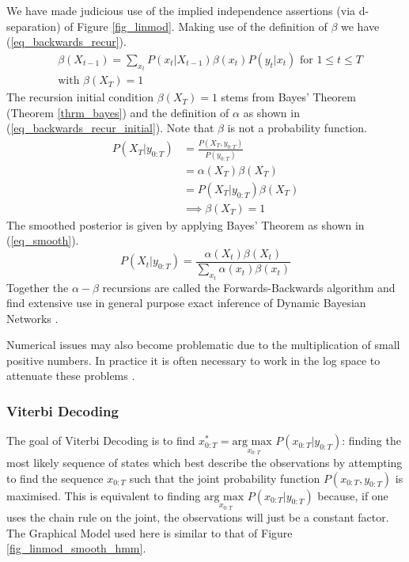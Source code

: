 We have made judicious use of the implied independence assertions (via d-separation) of Figure \ref{fig_linmod}. Making use of the definition of $\beta$ we have (\ref{eq_backwards_recur}).
\begin{equation}
\begin{aligned}
&\beta(X_{t-1}) = \sum_{x_t} P(x_t | X_{t-1})\beta(x_t)P(y_t| x_t) \text{ for } 1 \leq t \leq T \\
&\text{with } \beta(X_T) = 1
\end{aligned}
\label{eq_backwards_recur}
\end{equation}
The recursion initial condition $\beta(X_T) = 1$ stems from Bayes' Theorem (Theorem \ref{thrm_bayes}) and the definition of $\alpha$ as shown in (\ref{eq_backwards_recur_initial}). Note that $\beta$ is not a probability function.
\begin{equation}
\begin{aligned}
P(X_T|y_{0:T}) &= \frac{P(X_T, y_{0:T})}{P(y_{0:T})} \\
&= \alpha(X_T) \beta(X_T)\\
&= P(X_T| y_{0:T}) \beta(X_T)\\
&\implies \beta(X_T) = 1
\end{aligned}
\label{eq_backwards_recur_initial}
\end{equation}
The smoothed posterior is given by applying Bayes' Theorem as shown in (\ref{eq_smooth}).
\begin{equation}
P(X_t|y_{0:T}) = \frac{\alpha(X_t)\beta(X_t)}{\sum_{x_t}\alpha(x_t)\beta(x_t)}
\label{eq_smooth}
\end{equation}
Together the $\alpha - \beta$ recursions are called the Forwards-Backwards algorithm and find extensive use in general purpose exact inference of Dynamic Bayesian Networks \cite{murphy1}.

Numerical issues may also become problematic due to the multiplication of small positive numbers. In practice it is often necessary to work in the log space to attenuate these problems \cite{barber}. 

\subsubsection{Viterbi Decoding}
The goal of Viterbi Decoding is to find $x_{0:T}^* = \underset{x_{0:T}}{\text{arg max }} P(x_{0:T}|y_{0:T})$: finding the most likely sequence of states which best describe the observations by  attempting to find the sequence $x_{0:T}$ such that the joint probability function $P(x_{0:T}, y_{0:T})$ is maximised. This is equivalent to finding $ \underset{x_{0:T}}{\text{arg max }} P(x_{0:T}|y_{0:T})$ because, if one uses the chain rule on the joint, the observations will just be a constant factor. The Graphical Model used here is similar to that of Figure \ref{fig_linmod_smooth_hmm}.

